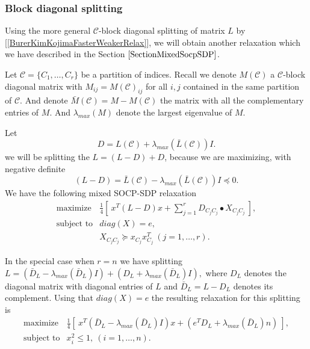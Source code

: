 \documentclass[12pt]{book}
\theoremstyle{definition}
\begin{document}
\subsubsection{Block diagonal splitting}

Using the more general $\mathcal{C}$-block diagonal splitting of matrix $L$ by [\ref{BurerKimKojimaFasterWeakerRelax}], we will obtain another relaxation which we have described in the Section $\ref{SectionMixedSocpSDP}$. 

Let $\mathcal{C}=\{C_1,\dots ,C_r\}$ be a partition of indices. Recall we denote $M(\mathcal{C})$ a $\mathcal{C}$-block diagonal matrix with $M_{ij} = M(\mathcal{C})_{ij}$ for all $i,j$ contained in the same partition of $\mathcal{C}$. And denote $\bar{M}(\mathcal{C}) = M-M(\mathcal{C})$ the matrix with all the complementary entries of $M$.
And $\lambda_{max}(M)$ denote the largest eigenvalue of $M$.

Let 
$$ D = L(\mathcal{C}) + \lambda_{max}(\bar{L}(\mathcal{C}))I .$$
we will be splitting the $L = (L - D) + D$, because we are maximizing, with negative definite
$$(L - D)= \bar{L}(\mathcal{C}) - \lambda_{max}(\bar{L}(\mathcal{C}))I \preceq 0.$$
We have the following mixed SOCP-SDP relaxation 
\begin{equation}
\label{MaxCutMixedSocpSdpR}
\begin{array}{ll}
\mbox{maximize} & \frac{1}{4}\left[ \ x^T(L-D)x + \sum_{j=1}^r D_{C_jC_j}\bullet X_{C_jC_j} \ \right], \\
\mbox{subject to} & diag(X) = e ,\\
&	X_{C_jC_j}\succeq x_{C_j}x_{C_j}^T \ (j=1,\dots ,r).
\end{array}
\end{equation}

In the special case when $r = n$ we have splitting
$L = (\bar{D}_L - \lambda_{max}(\bar{D}_L)I) + (D_L + \lambda_{max}(\bar{D}_L)I),$
where $D_L$ denotes the diagonal matrix with diagonal entries of $L$
and $\bar{D}_L = L - D_L$ denotes its complement.
Using that $diag(X) = e$ the resulting relaxation for this splitting is
\begin{equation}
\label{MaxCutMixedSocpSdpN}
\begin{array}{ll}
\mbox{maximize} & \frac{1}{4}\left[ \ x^T(\bar{D}_L - \lambda_{max}(\bar{D}_L)I)x + (e^TD_L + \lambda_{max}(\bar{D}_L)n) \ \right], \\
\mbox{subject to} & x_i^2 \leq 1, \ (i=1,\dots ,n).
\end{array}
\end{equation}
\end{document}

